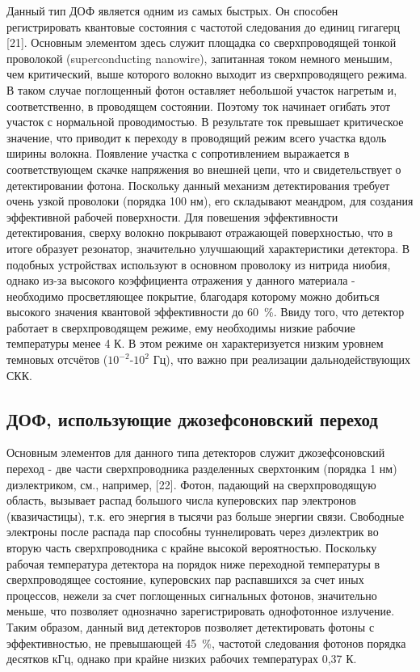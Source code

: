 Данный тип ДОФ является одним из самых быстрых. Он способен регистрировать квантовые состояния с частотой следования до единиц гигагерц [21]. Основным элементом здесь служит площадка со сверхпроводящей тонкой проволокой (superconducting nanowire), запитанная током немного меньшим, чем критический, выше которого волокно выходит из сверхпроводящего режима. В таком случае поглощенный фотон оставляет небольшой участок нагретым и, соответственно, в проводящем состоянии. Поэтому ток начинает огибать этот участок с нормальной проводимостью. В результате ток превышает критическое значение, что приводит к переходу в проводящий режим всего участка вдоль ширины волокна. Появление участка с сопротивлением выражается в соответствующем скачке напряжения во внешней цепи, что и свидетельствует о детектировании фотона. Поскольку данный механизм детектирования требует очень узкой проволоки (порядка 100 нм), его складывают меандром, для создания эффективной рабочей поверхности. Для повешения эффективности детектирования, сверху волокно покрывают отражающей поверхностью, что в итоге образует резонатор, значительно улучшающий характеристики детектора. В подобных устройствах используют в основном проволоку из нитрида ниобия, однако из-за высокого коэффициента отражения у данного материала - необходимо просветляющее покрытие, благодаря которому можно добиться высокого значения квантовой эффективности до 60~\%. Ввиду того, что детектор работает в сверхпроводящем режиме, ему необходимы низкие рабочие температуры менее 4 К. В этом режиме он характеризуется низким уровнем темновых отсчётов ($10^{-2}$-$10^2$ Гц), что важно при реализации дальнодействующих СКК.

\subsection{ДОФ, использующие джозефсоновский переход} \label{subsec:ch1/sec5/sub4}

Основным элементов для данного типа детекторов служит джозефсоновский переход - две части сверхпроводника разделенных сверхтонким (порядка 1 нм) диэлектриком, см., например, [22]. Фотон, падающий на сверхпроводящую область, вызывает распад большого числа куперовских пар электронов (квазичастицы), т.\:к. его энергия в тысячи раз больше энергии связи. Свободные электроны после распада пар способны туннелировать через диэлектрик во вторую часть сверхпроводника с крайне высокой вероятностью. Поскольку рабочая температура детектора на порядок ниже переходной температуры в сверхпроводящее состояние, куперовских пар распавшихся за счет иных процессов, нежели за счет поглощенных сигнальных фотонов, значительно меньше, что позволяет однозначно зарегистрировать однофотонное излучение. Таким образом, данный вид детекторов позволяет детектировать фотоны с эффективностью, не превышающей 45~\%, частотой следования фотонов порядка десятков кГц, однако при крайне низких рабочих температурах 0,37 К.

